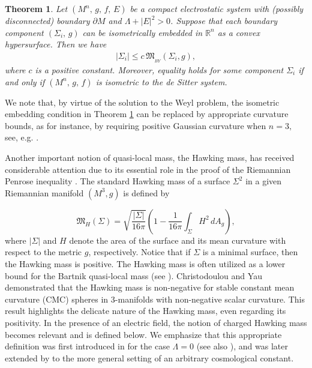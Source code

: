 \documentclass{amsart}
\newtheorem{theoremletter}{Theorem}
\numberwithin{equation}{section}
\begin{document}
	
\begin{theoremletter}
\label{teoBY}
Let $(M^n,\,g,\,f,\,E)$ be a compact electrostatic system with (possibly disconnected) boundary $\partial M$ and $\Lambda+|E|^{2}>0$. Suppose that each boundary component $(\Sigma_{i},\,g)$ can be isometrically embedded in $\mathbb{R}^n$ as a convex hypersurface. Then we have
\begin{eqnarray}\label{eqq4}
|\Sigma_{i}|\leq c\, \mathfrak{M}_{_{BY}}(\Sigma_i,g),
\end{eqnarray} where $c$ is a positive constant. Moreover, equality holds for some component $\Sigma_{i}$ if and only if $(M^n,\, g,\, f)$ is isometric to the de Sitter system. 
\end{theoremletter}


We note that, by virtue of the solution to the Weyl problem, the isometric embedding condition in Theorem \ref{teoBY} can be replaced by appropriate curvature bounds, as for instance, by requiring positive Gaussian curvature when $n = 3,$ see, e.g. \cite{FY,yuan}.




Another important notion of quasi-local mass, the Hawking mass, has received considerable attention due to its essential role in the proof of the Riemannian Penrose inequality \cite{huisken2001}. The standard Hawking mass of a surface \(\Sigma^2\) in a given Riemannian manifold \((M^3, g)\) is defined by

\[
\mathfrak{M}_{H}(\Sigma) = \sqrt{\frac{|\Sigma|}{16 \pi}} \left( 1 - \frac{1}{16\pi} \int_{\Sigma} H^2 \, dA_{g} \right),
\]
where \(|\Sigma|\) and \(H\) denote the area of the surface and its mean curvature with respect to the metric \(g\), respectively. Notice that if \(\Sigma\) is a minimal surface, then the Hawking mass is positive. The Hawking mass is often utilized as a lower bound for the Bartnik quasi-local mass (see \cite{miao2020}). Christodoulou and Yau \cite{christodoulou1986} demonstrated that the Hawking mass is non-negative for stable constant mean curvature (CMC) spheres in $3$-manifolds with non-negative scalar curvature. This result highlights the delicate nature of the Hawking mass, even regarding its positivity. In the presence of an electric field, the notion of charged Hawking mass becomes relevant and is defined below. We emphasize that this appropriate definition was first introduced in \cite[Section~3]{khuri} for the case  \(\Lambda = 0\) (see also \cite{hayward}), and was later extended by \cite{baltazar2023} to the more general setting of an arbitrary cosmological constant.
\end{document}
